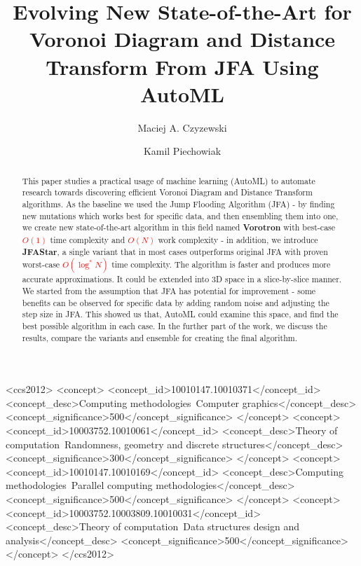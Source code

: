 \documentclass[format=acmsmall,screen,review,authordraft,nonacm]{acmart}
\title{Evolving New State-of-the-Art for Voronoi Diagram and Distance Transform From JFA Using AutoML}
\author{Maciej A. Czyzewski}
\affiliation{%
 \department{Institute of Computing Science}
 \institution{Poznan University of Technology}
 \city{Poznan}
 \country{Poland}}
\author{Kamil Piechowiak}
\affiliation{%
 \department{Institute of Computing Science}
 \institution{Poznan University of Technology}
 \city{Poznan}
 \country{Poland}}
\newcommand{\ourjfasingle}{JFAStar}
\newcommand{\ourjfa}{Vorotron} %
\begin{document}



\begin{abstract}
This paper studies a practical usage of machine learning (AutoML) to automate
research towards discovering efficient Voronoi Diagram and Distance
Transform algorithms.  As the baseline we used the Jump Flooding Algorithm
(JFA) - by finding new mutations which works best for specific data, and
then ensembling them into one, we create new state-of-the-art algorithm in
this field named \textbf{\ourjfa} with best-case
\textcolor{red}{$O(1)$} time complexity and \textcolor{red}{$O(N)$} work
complexity - in addition, we introduce \textbf{\ourjfasingle}, a single
variant that in most cases outperforms original JFA with proven worst-case
\textcolor{red}{$O(\log^{*}N)$} time complexity.
The algorithm is faster and produces more accurate approximations. It could be
extended into 3D space in a slice-by-slice manner.  We started from the
assumption that JFA has potential for improvement - some benefits can be
observed for specific data by adding random noise and adjusting the step size in
JFA.  This showed us that, AutoML could examine this space, and find the best
possible algorithm in each case.  In the further part of the work, we discuss
the results, compare the variants and ensemble for creating the final algorithm.
\end{abstract}



\begin{CCSXML}
<ccs2012>
<concept>
<concept_id>10010147.10010371</concept_id>
<concept_desc>Computing methodologies~Computer graphics</concept_desc>
<concept_significance>500</concept_significance>
</concept>
<concept>
<concept_id>10003752.10010061</concept_id>
<concept_desc>Theory of computation~Randomness, geometry and discrete structures</concept_desc>
<concept_significance>300</concept_significance>
</concept>
<concept>
<concept_id>10010147.10010169</concept_id>
<concept_desc>Computing methodologies~Parallel computing methodologies</concept_desc>
<concept_significance>500</concept_significance>
</concept>
<concept>
<concept_id>10003752.10003809.10010031</concept_id>
<concept_desc>Theory of computation~Data structures design and analysis</concept_desc>
<concept_significance>500</concept_significance>
</concept>
</ccs2012>
\end{CCSXML}
\end{document}
